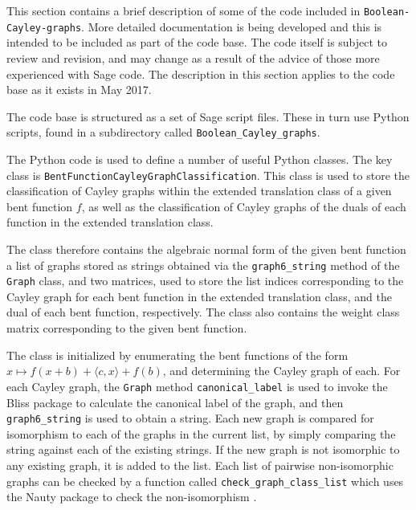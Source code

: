 \documentclass[12pt,a4paper]{article}
\begin{document}
This section contains a brief description of some of the code included in
\texttt{Boolean-Cayley-graphs}.
More detailed documentation is being developed and this is intended to be included as part of the code base.
The code itself is subject to review and revision, and may change as a result of the advice of
those more experienced with Sage code.
The description in this section applies to the code base as it exists in May 2017.

The code base is structured as a set of Sage script files. %
These in turn use Python scripts, found in a  subdirectory called \texttt{Boolean\_Cayley\_graphs}.

The Python code is used to define a number of useful Python classes.
The key class is \texttt{BentFunctionCayleyGraphClassification}.
This class is used to store the classification of Cayley graphs within the extended translation
class of a given bent function $f$, as well as the classification of Cayley graphs of the duals of
each function in the extended translation class.

The class therefore contains the algebraic normal form of the given bent function
a list of graphs
stored as strings obtained via the \texttt{graph6\_string} \cite{McKP13nauty}
method of the \texttt{Graph} class, and two matrices,
used to store the list indices corresponding to
the Cayley graph for each bent function in the extended translation class, and the dual of each bent
function, respectively.
The class also contains the weight class matrix
corresponding to the given bent function.

The class is initialized by enumerating the bent functions of the form
$x \mapsto f(x+b) + \langle c, x \rangle + f(b)$,
and determining the Cayley graph of each.
For each Cayley graph, the \texttt{Graph} method \texttt{canonical\_label} is used
to invoke the Bliss package \cite{JunK07Bliss,JukN11conflict} to calculate the canonical label
of the graph, and then \texttt{graph6\_string} is used to obtain a string.
Each new graph is compared for isomorphism to each of the graphs in the current list,
by simply comparing the string against each of the existing strings.
If the new graph is not isomorphic to any existing graph, it is added to the list.
Each list of pairwise non-isomorphic graphs can be checked by a function called \texttt{check\_graph\_class\_list}
which uses the Nauty package to check the non-isomorphism \cite{McKP13nauty,McKP14practical}.
\end{document}
